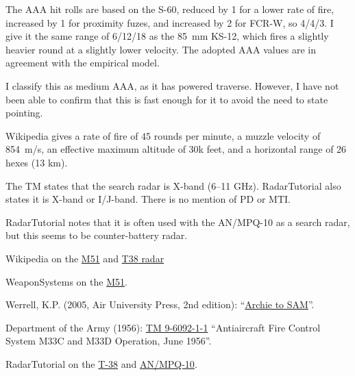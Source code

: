 \begin{withcounters}
{        

        The AAA hit rolls are based on the S-60, reduced by 1 for a lower rate of fire, increased by 1 for proximity fuzes, and increased by 2 for FCR-W, so 4/4/3. I give it the same range of 6/12/18 as the 85~mm KS-12, which fires a slightly heavier round at a slightly lower velocity.
        The adopted AAA values are in agreement with the empirical model.

        I classify this as medium AAA, as it has powered traverse. However, I have not been able to confirm that this is fast enough for it to avoid the need to state pointing.

        Wikipedia gives a rate of fire of 45 rounds per minute, a muzzle velocity of 854~m/s, an effective maximum altitude of 30k feet, and a horizontal range of 26 hexes (13 km).

        The TM states that the search radar is X-band (6--11 GHz). RadarTutorial also states it is X-band or I/J-band. There is no mention of PD or MTI.

        RadarTutorial notes that it is often used with the AN/MPQ-10 as a search radar, but this seems to be counter-battery radar.

        \begin{notesources}
            \item Wikipedia on the \href{https://en.wikipedia.org/wiki/M51_Skysweeper}{M51} and \href{https://en.wikipedia.org/wiki/Western_Electric_M-33_Antiaircraft_Fire_Control_System}{T38 radar}
            \item WeaponSystems on the \href{https://weaponsystems.net/system/421-M51+Skysweeper}{M51}.
            \item Werrell, K.P. (2005, Air University Press, 2nd edition): “\href{https://media.defense.gov/2017/Mar/31/2001725225/-1/-1/0/B_0028_WERRELL_ARCHIE_TO_SAM.PDF}{Archie to SAM}”.
            \item Department of the Army (1956): \href{https://www.usarmygermany.com/Sont.htm?http&&&www.usarmygermany.com/Units/Air\%20Defense/USAREUR_ADA\%20Overview\%201.htm}{TM 9-6092-1-1} “Antiaircraft Fire Control System M33C and M33D Operation, June 1956”.
            \item RadarTutorial on the \href{https://www.radartutorial.eu/19.kartei/11.ancient7/karte098.en.html}{T-38} and \href{https://www.radartutorial.eu/19.kartei/11.ancient3/karte037.en.html}{AN/MPQ-10}.
        \end{notesources}
    }

\end{withcounters}

